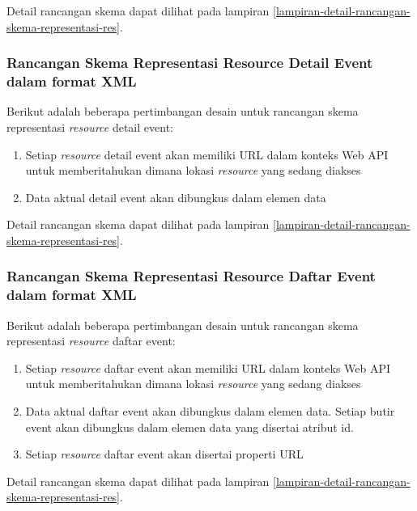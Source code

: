 \documentclass[a4paper, 12pt, oneside]{report}
\begin{document}
Detail rancangan skema dapat dilihat pada lampiran \ref{lampiran-detail-rancangan-skema-representasi-res}.

\subsubsection{Rancangan Skema Representasi Resource Detail Event dalam format XML}

\onehalfspacing Berikut adalah beberapa pertimbangan desain untuk rancangan skema representasi \textit{resource} detail event:

\begin{enumerate}
  \item Setiap \textit{resource} detail event akan memiliki URL dalam konteks Web API untuk memberitahukan dimana lokasi \textit{resource} yang sedang diakses
  \item Data aktual detail event akan dibungkus dalam elemen data
\end{enumerate}

Detail rancangan skema dapat dilihat pada lampiran \ref{lampiran-detail-rancangan-skema-representasi-res}.

\subsubsection{Rancangan Skema Representasi Resource Daftar Event dalam format XML}

\onehalfspacing Berikut adalah beberapa pertimbangan desain untuk rancangan skema representasi \textit{resource} daftar event:

\begin{enumerate}
  \item Setiap \textit{resource} daftar event akan memiliki URL dalam konteks Web API untuk memberitahukan dimana lokasi \textit{resource} yang sedang diakses
  \item Data aktual daftar event akan dibungkus dalam elemen data. Setiap butir event akan dibungkus dalam elemen data yang disertai atribut id.
\item Setiap \textit{resource} daftar event akan disertai properti URL
\end{enumerate}

Detail rancangan skema dapat dilihat pada lampiran \ref{lampiran-detail-rancangan-skema-representasi-res}.
\end{document}
